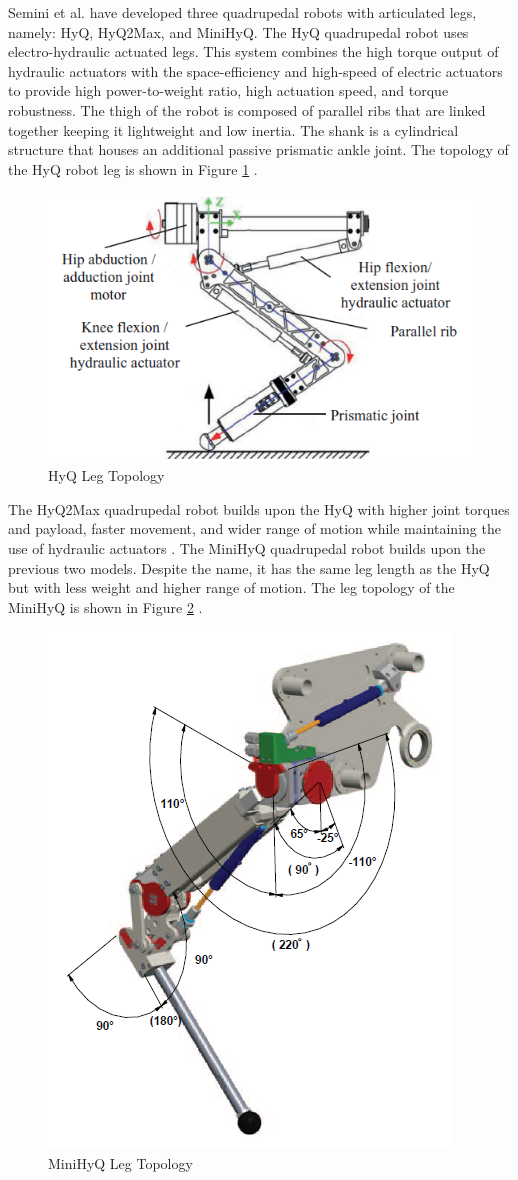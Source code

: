 \documentclass[english]{upeeei}
\begin{document}
Semini et al. have developed three quadrupedal robots with articulated legs, namely: HyQ, HyQ2Max, and MiniHyQ. The HyQ quadrupedal robot uses electro-hydraulic actuated legs. This system combines the high torque output of hydraulic actuators with the space-efficiency and high-speed of electric actuators to provide high power-to-weight ratio, high actuation speed, and torque robustness. The thigh of the robot is composed of parallel ribs that are linked together keeping it lightweight and low inertia. The shank is a cylindrical structure that houses an additional passive prismatic ankle joint. The topology of the HyQ robot leg is shown in Figure \ref{fig:hyq-leg} \cite{quadrobotlegs, hyq}.

\begin{figure}[H]
\begin{centering}
\includegraphics[width=0.7\columnwidth]{images/hyq}
\par\end{centering}
\caption{HyQ Leg Topology\label{fig:hyq-leg}}
\end{figure}

The HyQ2Max quadrupedal robot builds upon the HyQ with higher joint torques and payload, faster movement, and wider range of motion while maintaining the use of hydraulic actuators \cite{hyq2max}. The MiniHyQ quadrupedal robot builds upon the previous two models. Despite the name, it has the same leg length as the HyQ but with less weight and higher range of motion. The leg topology of the MiniHyQ is shown in Figure \ref{fig:mini-hyq-leg} \cite{minihyq}.

\begin{figure}[H]
\begin{centering}
\includegraphics[width=0.3\columnwidth]{images/minihyq}
\par\end{centering}
\caption{MiniHyQ Leg Topology\label{fig:mini-hyq-leg}}
\end{figure}
\end{document}
